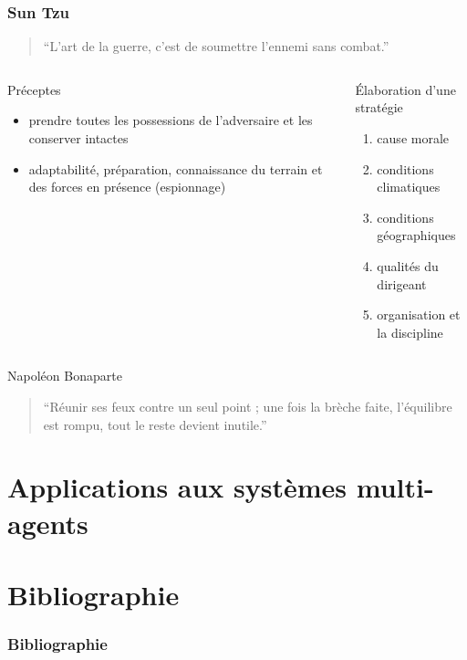 \documentclass[utf8]{beamer}
\begin{document}
\begin{frame}
\frametitle{Sun Tzu}
\begin{quote}“L'art de la guerre, c'est de soumettre l'ennemi sans combat.”\end{quote}
\vfill
\begin{columns}[t]
\begin{column}{0.5\linewidth}
Préceptes
\begin{itemize}
\item prendre toutes les possessions de l'adversaire et les conserver intactes
\item adaptabilité, préparation, connaissance du terrain et des forces en présence (espionnage)
\end{itemize}
\end{column}
\begin{column}{0.5\linewidth}
Élaboration d'une stratégie
\begin{enumerate}
\item cause morale
\item conditions climatiques
\item conditions géographiques
\item qualités du dirigeant
\item organisation et la discipline
\end{enumerate}
\end{column}
\end{columns}

\end{frame}

\begin{frame}{Napoléon Bonaparte}
\begin{quote}“Réunir ses feux contre un seul point ; une fois la brèche faite, l’équilibre est rompu, tout le reste devient inutile.”\end{quote}
\end{frame}


\section{Applications aux systèmes multi-agents}
\frame{\sectionpage}

\section{Bibliographie}

%
\begin{frame}
\frametitle{Bibliographie}

\end{frame}
\end{document}
